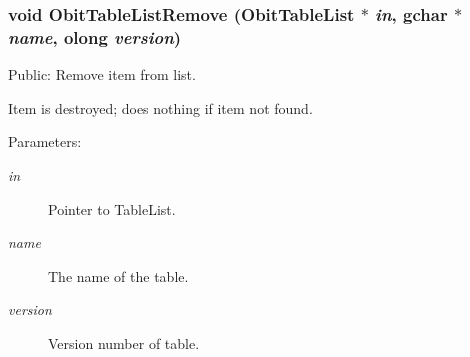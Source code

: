 \subsubsection{\setlength{\rightskip}{0pt plus 5cm}void Obit\-Table\-List\-Remove ({\bf Obit\-Table\-List} $\ast$ {\em in}, gchar $\ast$ {\em name}, {\bf olong} {\em version})}\label{ObitTableList_8h_a16}


Public: Remove item from list. 

Item is destroyed; does nothing if item not found. \begin{Desc}
\item[Parameters:]
\begin{description}
\item[{\em in}]Pointer to Table\-List. \item[{\em name}]The name of the table. \item[{\em version}]Version number of table. \end{description}
\end{Desc}
